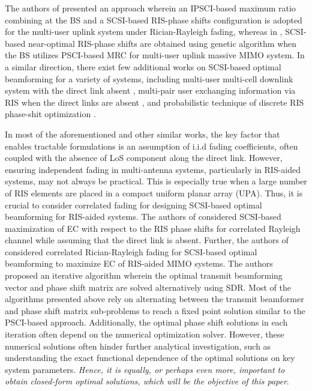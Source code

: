 \documentclass[journal,draftclsnofoot,onecolumn,12pt]{IEEEtran}
\begin{document}
The authors of \cite{ZhiKangda_2021_SCSI_SPAWC} presented  an approach wherein an IPSCI-based maximum ratio combining at the BS and a SCSI-based RIS-phase shifts configuration is adopted  for the multi-user uplink system under Rician-Rayleigh fading, whereas in  \cite{ZhiKangda_SSCI_mMIMO_2021}, SCSI-based near-optimal RIS-phase shifts are obtained using genetic algorithm when the BS utilizes PSCI-based MRC for multi-user uplink massive MIMO system.
In a similar direction, there exist few additional works on SCSI-based optimal beamforming for a variety of systems, including
multi-user multi-cell downlink system with the direct link absent \cite{LuoCaihong_Cellular_MISO_SSCI_2021}, multi-pair user exchanging information via RIS when the direct links are absent \cite{PengZhangjie_2021_SCSI}, and probabilistic technique  of discrete RIS phase-shit optimization  \cite{pradhan2023probabilistic}. 

In most of the aforementioned and other similar works, the key factor that enables tractable formulations is an assumption of {\rm i.i.d}  fading coefficients, often coupled with the absence of  LoS component along the direct link. However, ensuring independent fading in multi-antenna systems, particularly in RIS-aided systems, may not always be practical. This is especially true when  a large number of RIS elements are placed in a compact uniform planar array (UPA). Thus, it is crucial to consider  correlated fading for designing SCSI-based optimal beamforming for RIS-aided systems. The authors of \cite{Papazafeiropoulos_2022_SCSI_CorrFading} considered SCSI-based maximization of EC with respect to the RIS phase shifts for correlated Rayleigh channel while assuming that the direct link is absent. Further, the authors of \cite{WangJinghe_CorrelatedFading_2021} considered correlated Rician-Rayleigh fading for SCSI-based optimal beamforming to maximize EC of RIS-aided MIMO systems.  The authors proposed an iterative algorithm wherein the  optimal transmit beamforming vector and phase shift matrix are solved alternatively using SDR.
Most of the algorithms presented above rely on alternating between the transmit beamformer and phase shift matrix sub-problems to reach a fixed point solution similar to the PSCI-based approach. Additionally, the optimal phase shift solutions in each iteration often depend on the numerical optimization solver. However, these numerical solutions often hinder further analytical investigation, such as understanding the exact functional dependence of the optimal solutions on key system parameters. {\em Hence, it is equally, or perhaps even more, important to obtain closed-form optimal solutions, which will be the objective of this paper}.
\end{document}
